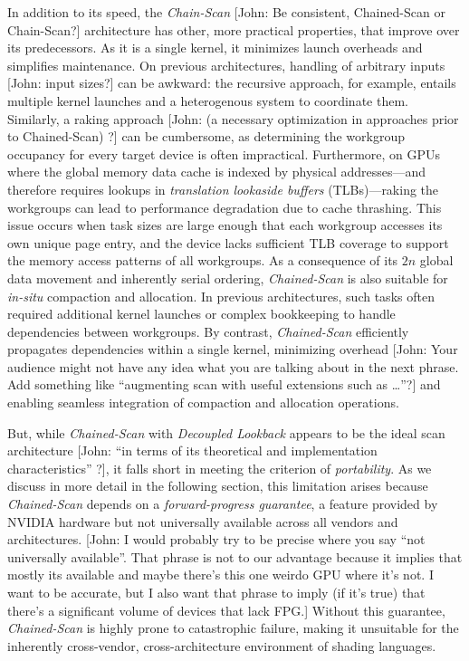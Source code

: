 \documentclass[sigconf]{acmart}
\newcommand{\john}[1]{{\footnotesize\color{cyan}[John: #1]}}
\begin{document}
In addition to its speed, the \emph{Chain-Scan} \john{Be consistent, Chained-Scan or Chain-Scan?} architecture has other, more practical properties, that improve over its predecessors. As it is a single kernel, it minimizes launch overheads and simplifies maintenance. On previous architectures, handling of arbitrary inputs \john{input sizes?} can be awkward: the recursive approach, for example, entails multiple kernel launches and a heterogenous system to coordinate them. Similarly, a raking approach \john{(a necessary optimization in approaches prior to Chained-Scan) ?} can be cumbersome, as determining the workgroup occupancy for every target device is often impractical. Furthermore, on GPUs where the global memory data cache is indexed by physical addresses—and therefore requires lookups in \emph{translation lookaside buffers} (TLBs)—raking the workgroups can lead to performance degradation due to cache thrashing. This issue occurs when task sizes are large enough that each workgroup accesses its own unique page entry, and the device lacks sufficient TLB coverage to support the memory access patterns of all workgroups. As a consequence of its $2n$ global data movement and inherently serial ordering, \emph{Chained-Scan} is also suitable for \emph{in-situ} compaction and allocation. In previous architectures, such tasks often required additional kernel launches or complex bookkeeping to handle dependencies between workgroups. By contrast, \emph{Chained-Scan} efficiently propagates dependencies within a single kernel, minimizing overhead \john{Your audience might not have any idea what you are talking about in the next phrase. Add something like ``augmenting scan with useful extensions such as \ldots''?} and enabling seamless integration of compaction and allocation operations.

But, while \emph{Chained-Scan} with \emph{Decoupled Lookback} appears to be the ideal scan architecture \john{``in terms of its theoretical and implementation characteristics'' ?}, it falls short in meeting the criterion of \emph{portability}. As we discuss in more detail in the following section, this limitation arises because \emph{Chained-Scan} depends on a \emph{forward-progress guarantee}, a feature provided by NVIDIA hardware but not universally available across all vendors and architectures. \john{I would probably try to be precise where you say ``not universally available''. That phrase is not to our advantage because it implies that mostly its available and maybe there's this one weirdo GPU where it's not. I want to be accurate, but I also want that phrase to imply (if it's true) that there's a significant volume of devices that lack FPG\@.} Without this guarantee, \emph{Chained-Scan} is highly prone to catastrophic failure, making it unsuitable for the inherently cross-vendor, cross-architecture environment of shading languages.
\end{document}
